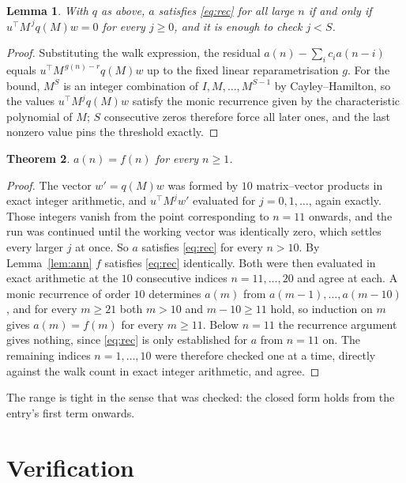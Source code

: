 \documentclass[11pt,a4paper]{article}
\theoremstyle{plain}
\newtheorem{theorem}{Theorem}
\newtheorem{lemma}[theorem]{Lemma}
\theoremstyle{definition}
\begin{document}
\begin{lemma}\label{lem:crit}
With $q$ as above, $a$ satisfies \eqref{eq:rec} for all large $n$ if and only if
$u^{\!\top}M^{\,j}q(M)w=0$ for every $j\ge0$, and it is enough to check $j<S$.
\end{lemma}

\begin{proof}
Substituting the walk expression, the residual $a(n)-\sum_ic_ia(n-i)$ equals
$u^{\!\top}M^{\,g(n)-r}q(M)w$ up to the fixed linear reparametrisation $g$. For the bound,
$M^{S}$ is an integer combination of $I,M,\dots,M^{S-1}$ by Cayley--Hamilton, so the values
$u^{\!\top}M^{j}q(M)w$ satisfy the monic recurrence given by the characteristic polynomial of
$M$; $S$ consecutive zeros therefore force all later ones, and the last nonzero value pins the
threshold exactly.
\end{proof}

\begin{theorem}
$a(n)=f(n)$ for every $n\ge1$.
\end{theorem}

\begin{proof}
The vector $w'=q(M)w$ was formed by $10$ matrix--vector products in exact integer
arithmetic, and $u^{\!\top}M^{j}w'$ evaluated for $j=0,1,\dots$, again exactly. Those integers
vanish from the point corresponding to $n=11$ onwards, and the run was continued until the
working vector was identically zero, which settles every larger $j$ at once. So $a$ satisfies
\eqref{eq:rec} for every $n>10$. By Lemma~\ref{lem:ann} $f$ satisfies \eqref{eq:rec}
identically. Both were then evaluated in exact arithmetic at the $10$ consecutive indices
$n=11,\dots,20$ and agree at each. A monic recurrence of order $10$
determines $a(m)$ from $a(m-1),\dots,a(m-10)$, and for every $m\ge21$ both
$m>10$ and $m-10\ge11$ hold, so induction on $m$ gives $a(m)=f(m)$ for every
$m\ge11$.
Below $n=11$ the recurrence argument gives nothing, since \eqref{eq:rec} is only
established for $a$ from $n=11$ on. The remaining indices $n=1,\dots,10$ were
therefore checked one at a time, directly against the walk count in exact integer arithmetic,
and agree.
\end{proof}

The range is tight in the sense that was checked: the closed form holds from the entry's first term onwards.

\section{Verification}
\end{document}
